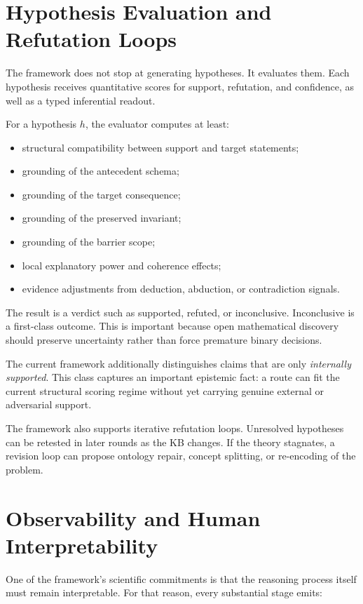 \documentclass[11pt]{article}
\begin{document}
\section{Hypothesis Evaluation and Refutation Loops}

The framework does not stop at generating hypotheses. It evaluates them. Each hypothesis receives quantitative scores for support, refutation, and confidence, as well as a typed inferential readout.

For a hypothesis $h$, the evaluator computes at least:

\begin{itemize}[leftmargin=*,itemsep=0.2em]
\item structural compatibility between support and target statements;
\item grounding of the antecedent schema;
\item grounding of the target consequence;
\item grounding of the preserved invariant;
\item grounding of the barrier scope;
\item local explanatory power and coherence effects;
\item evidence adjustments from deduction, abduction, or contradiction signals.
\end{itemize}

The result is a verdict such as supported, refuted, or inconclusive. Inconclusive is a first-class outcome. This is important because open mathematical discovery should preserve uncertainty rather than force premature binary decisions.

The current framework additionally distinguishes claims that are only \emph{internally supported}. This class captures an important epistemic fact: a route can fit the current structural scoring regime without yet carrying genuine external or adversarial support.

The framework also supports iterative refutation loops. Unresolved hypotheses can be retested in later rounds as the KB changes. If the theory stagnates, a revision loop can propose ontology repair, concept splitting, or re-encoding of the problem.

\section{Observability and Human Interpretability}

One of the framework's scientific commitments is that the reasoning process itself must remain interpretable. For that reason, every substantial stage emits:
\end{document}
